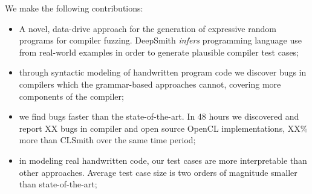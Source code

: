 %
%

We make the following contributions:
%
\begin{itemize}
\item A novel, data-drive approach for the generation of expressive random programs for compiler fuzzing. DeepSmith \emph{infers} programming language use from real-world examples in order to generate plausible compiler test cases; %
\item through syntactic modeling of handwritten program code we discover bugs in compilers which the grammar-based approaches cannot, covering more components of the compiler;
\item we find bugs faster than the state-of-the-art. In 48 hours we discovered and report XX bugs in compiler and open source OpenCL implementations, XX\% more than CLSmith over the same time period;
\item in modeling real handwritten code, our test cases are more interpretable than other approaches. Average test case size is two orders of magnitude smaller than state-of-the-art;
\end{itemize}

